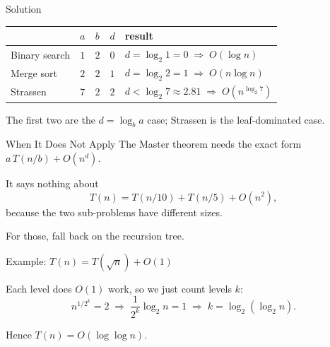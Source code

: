\documentclass[10pt,aspectratio=169]{beamer}
\begin{document}
\begin{frame}{Solution}
  \begin{center}
  \begin{tabular}{lcccl}
    \toprule
    & $a$ & $b$ & $d$ & result \\
    \midrule
    Binary search & $1$ & $2$ & $0$ & $d = \log_2 1 = 0 \;\Rightarrow\; O(\log n)$ \\
    Merge sort    & $2$ & $2$ & $1$ & $d = \log_2 2 = 1 \;\Rightarrow\; O(n \log n)$ \\
    Strassen      & $7$ & $2$ & $2$ & $d < \log_2 7 \approx 2.81 \;\Rightarrow\; O(n^{\log_2 7})$ \\
    \bottomrule
  \end{tabular}
  \end{center}

  \bigskip
  \begin{center}
    \small The first two are the $d = \log_b a$ case; Strassen is the leaf-dominated case.
  \end{center}
\end{frame}

\begin{frame}{When It Does Not Apply}
  The Master theorem needs the exact form $a\,T(n/b) + O(n^d)$.

  \bigskip
  It says nothing about
  \[
    T(n) = T(n/10) + T(n/5) + O(n^2),
  \]
  because the two sub-problems have \alert{different sizes}.

  \bigskip
  \begin{center}
    For those, fall back on the recursion tree.
  \end{center}
\end{frame}

\begin{frame}{Example: $T(n) = T(\sqrt{n}) + O(1)$}
  \begin{center}
  \end{center}

  Each level does $O(1)$ work, so we just count levels $k$:
  \[
    n^{1/2^k} = 2
    \;\Longrightarrow\;
    \frac{1}{2^k}\log_2 n = 1
    \;\Longrightarrow\;
    k = \log_2(\log_2 n).
  \]

  \begin{center}
    Hence $T(n) = O(\log \log n)$.
  \end{center}
\end{frame}
\end{document}

